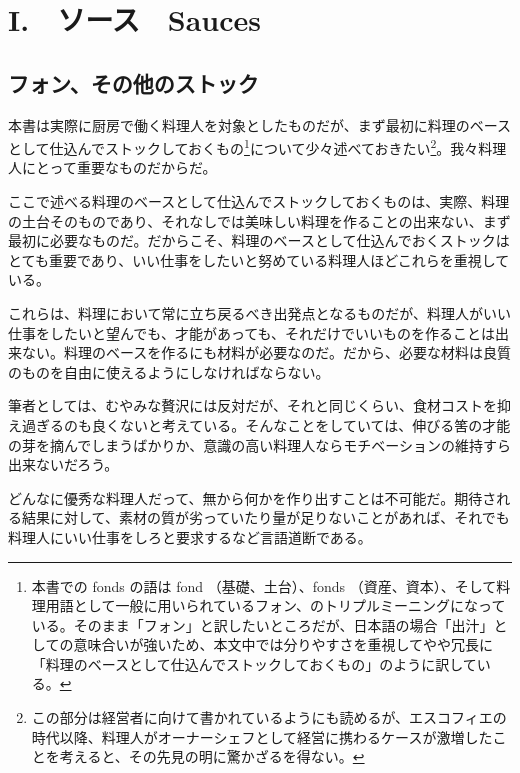 \hypertarget{sauces}{%
\chapter{I.　ソース　Sauces}\label{sauces}}

\hypertarget{les-fonds-de-cuisine}{%
\section{フォン、その他のストック}\label{les-fonds-de-cuisine}}


 

\normalsize
{}

本書は実際に厨房で働く料理人を対象としたものだが、まず最初に料理のベースとして仕込んでストックしておくもの\footnote{本書での
  fonds の語は fond （基礎、土台）、fonds
  （資産、資本）、そして料理用語として一般に用いられているフォン、のトリプルミーニングになっている。そのまま「フォン」と訳したいところだが、日本語の場合「出汁」としての意味合いが強いため、本文中では分りやすさを重視してやや冗長に「料理のベースとして仕込んでストックしておくもの」のように訳している。}について少々述べておきたい\footnote{この部分は経営者に向けて書かれているようにも読めるが、エスコフィエの時代以降、料理人がオーナーシェフとして経営に携わるケースが激増したことを考えると、その先見の明に驚かざるを得ない。}。我々料理人にとって重要なものだからだ。

ここで述べる料理のベースとして仕込んでストックしておくものは、実際、料理の土台そのものであり、それなしでは美味しい料理を作ることの出来ない、まず最初に必要なものだ。だからこそ、料理のベースとして仕込んでおくストックはとても重要であり、いい仕事をしたいと努めている料理人ほどこれらを重視している。

これらは、料理において常に立ち戻るべき出発点となるものだが、料理人がいい仕事をしたいと望んでも、才能があっても、それだけでいいものを作ることは出来ない。料理のベースを作るにも材料が必要なのだ。だから、必要な材料は良質のものを自由に使えるようにしなければならない。

筆者としては、むやみな贅沢には反対だが、それと同じくらい、食材コストを抑え過ぎるのも良くないと考えている。そんなことをしていては、伸びる筈の才能の芽を摘んでしまうばかりか、意識の高い料理人ならモチベーションの維持すら出来ないだろう。

どんなに優秀な料理人だって、無から何かを作り出すことは不可能だ。期待される結果に対して、素材の質が劣っていたり量が足りないことがあれば、それでも料理人にいい仕事をしろと要求するなど言語道断である。

